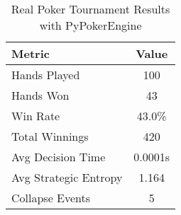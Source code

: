 \begin{table}[h]
\centering
\caption{Real Poker Tournament Results with PyPokerEngine}
\begin{tabular}{|l|c|}
\hline
Metric & Value \\
\hline
Hands Played & 100 \\
Hands Won & 43 \\
Win Rate & 43.0\% \\
Total Winnings & 420 \\
Avg Decision Time & 0.0001s \\
Avg Strategic Entropy & 1.164 \\
Collapse Events & 5 \\
\hline
\end{tabular}
\end{table}